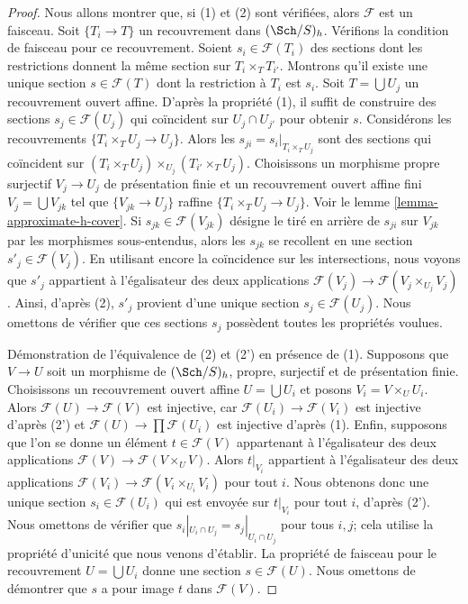\begin{proof}
Nous allons montrer que, si (1) et (2) sont vérifiées, alors $\mathcal{F}$ est un faisceau.
Soit $\{T_i \to T\}$ un recouvrement dans $(\Sch/S)_h$.
Vérifions la condition de faisceau pour ce recouvrement.
Soient $s_i \in \mathcal{F}(T_i)$ des sections dont les restrictions donnent la même
section sur $T_i \times_T T_{i'}$. Montrons qu'il existe une
unique section $s \in \mathcal{F}(T)$ dont la restriction à $T_i$ est $s_i$.
Soit $T = \bigcup U_j$ un recouvrement ouvert affine.
D'après la propriété (1), il suffit de construire des sections $s_j \in \mathcal{F}(U_j)$
qui coïncident sur $U_j \cap U_{j'}$ pour obtenir $s$.
Considérons les recouvrements $\{T_i \times_T U_j \to U_j\}$.
Alors les $s_{ji} = s_i|_{T_i \times_T U_j}$ sont des sections qui coïncident
sur $(T_i \times_T U_j) \times_{U_j} (T_{i'} \times_T U_j)$.
Choisissons un morphisme propre surjectif $V_j \to U_j$ de présentation finie
et un recouvrement ouvert affine fini $V_j = \bigcup V_{jk}$
tel que $\{V_{jk} \to U_j\}$ raffine $\{T_i \times_T U_j \to U_j\}$.
Voir le lemme \ref{lemma-approximate-h-cover}.
Si $s_{jk} \in \mathcal{F}(V_{jk})$
désigne le tiré en arrière de $s_{ji}$ sur $V_{jk}$ par les
morphismes sous-entendus, alors les $s_{jk}$ se recollent en une section
$s'_j \in \mathcal{F}(V_j)$. En utilisant encore la coïncidence sur les intersections,
nous voyons que $s'_j$ appartient à l'égalisateur des deux
applications $\mathcal{F}(V_j) \to \mathcal{F}(V_j \times_{U_j} V_j)$.
Ainsi, d'après (2), $s'_j$ provient d'une unique section
$s_j \in \mathcal{F}(U_j)$. Nous omettons de vérifier que ces
sections $s_j$ possèdent toutes les propriétés voulues.

\medskip\noindent
Démonstration de l'équivalence de (2) et (2') en présence de (1).
Supposons que $V \to U$ soit un morphisme de $(\Sch/S)_h$,
propre, surjectif et de présentation finie. Choisissons un
recouvrement ouvert affine $U = \bigcup U_i$ et posons $V_i = V \times_U U_i$.
Alors $\mathcal{F}(U) \to \mathcal{F}(V)$
est injective, car $\mathcal{F}(U_i) \to \mathcal{F}(V_i)$
est injective d'après (2') et $\mathcal{F}(U) \to \prod \mathcal{F}(U_i)$
est injective d'après (1). Enfin, supposons que l'on se donne un élément
$t \in \mathcal{F}(V)$ appartenant à l'égalisateur des deux applications
$\mathcal{F}(V) \to \mathcal{F}(V \times_U V)$.
Alors $t|_{V_i}$ appartient à l'égalisateur des deux applications
$\mathcal{F}(V_i) \to \mathcal{F}(V_i \times_{U_i} V_i)$
pour tout $i$. Nous obtenons donc une unique section $s_i \in \mathcal{F}(U_i)$
qui est envoyée sur $t|_{V_i}$ pour tout $i$, d'après (2').
Nous omettons de vérifier que $s_i|_{U_i \cap U_j} = s_j|_{U_i \cap U_j}$
pour tous $i, j$; cela utilise la propriété d'unicité que nous venons d'établir.
La propriété de faisceau pour le recouvrement $U = \bigcup U_i$ donne
une section $s \in \mathcal{F}(U)$. Nous omettons de démontrer que $s$
a pour image $t$ dans $\mathcal{F}(V)$.
\end{proof}


